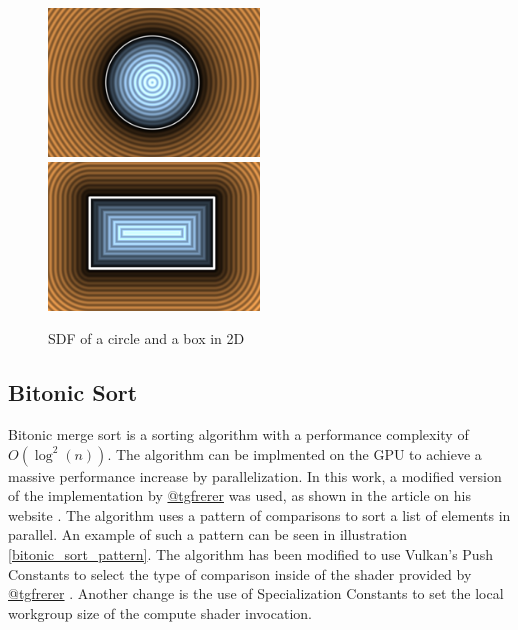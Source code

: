 \documentclass[intern]{cgMA}
\begin{document}
    \begin{figure}[H]
        \includegraphics[width=0.5\textwidth]{figures/gfx00.png}
        \includegraphics[width=0.5\textwidth]{figures/gfx02.png}
        \caption[SDF of a circle and a box in 2D \cite{iquilezles2}]{SDF of a circle and a box in 2D}
        \label{fig:sdf}
    \end{figure}

    \subsection{Bitonic Sort}

    Bitonic merge sort is a sorting algorithm with a performance complexity of $O(\log^2(n))$. The algorithm can be implmented on the GPU to achieve a massive performance increase by parallelization. In this work, a modified version of the implementation by \href{https://twitter.com/tgfrerer}{@tgfrerer} was used, as shown in the article on his website \cite{bitonic}. The algorithm uses a pattern of comparisons to sort a list of elements in parallel. An example of such a pattern can be seen in illustration \ref{bitonic_sort_pattern}. The algorithm has been modified to use Vulkan's Push Constants to select the type of comparison inside of the shader provided by \href{https://twitter.com/tgfrerer}{@tgfrerer} \cite{bitonic}. Another change is the use of Specialization Constants to set the local workgroup size of the compute shader invocation.
\end{document}
